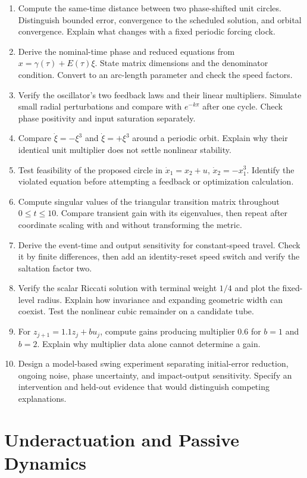 \documentclass[12pt, openany]{book}
\theoremstyle{plain}
\begin{document}
\begin{enumerate}[itemsep=3pt,parsep=0pt]
\item Compute the same-time distance between two phase-shifted unit circles.
Distinguish bounded error, convergence to the scheduled solution, and orbital
convergence. Explain what changes with a fixed periodic forcing clock.
\item Derive the nominal-time phase and reduced equations from
$x=\gamma(\tau)+E(\tau)\xi$. State matrix dimensions and the denominator
condition. Convert to an arc-length parameter and check the speed factors.
\item Verify the oscillator's two feedback laws and their linear multipliers.
Simulate small radial perturbations and compare with $e^{-k\pi}$ after one
cycle. Check phase positivity and input saturation separately.
\item Compare $\dot\xi=-\xi^3$ and $\dot\xi=+\xi^3$ around a periodic orbit.
Explain why their identical unit multiplier does not settle nonlinear stability.
\item Test feasibility of the proposed circle in
$\dot x_1=x_2+u$, $\dot x_2=-x_1^3$. Identify the violated equation before
attempting a feedback or optimization calculation.
\item Compute singular values of the triangular transition matrix throughout
$0\leq t\leq10$. Compare transient gain with its eigenvalues, then repeat
after coordinate scaling with and without transforming the metric.
\item Derive the event-time and output sensitivity for constant-speed travel.
Check it by finite differences, then add an identity-reset speed switch and
verify the saltation factor two.
\item Verify the scalar Riccati solution with terminal weight $1/4$ and plot
the fixed-level radius. Explain how invariance and expanding geometric width
can coexist. Test the nonlinear cubic remainder on a candidate tube.
\item For $z_{j+1}=1.1z_j+b u_j$, compute gains producing multiplier $0.6$
for $b=1$ and $b=2$. Explain why multiplier data alone cannot determine a gain.
\item Design a model-based swing experiment separating initial-error reduction,
ongoing noise, phase uncertainty, and impact-output sensitivity. Specify an
intervention and held-out evidence that would distinguish competing explanations.
\end{enumerate}

\chapter{Underactuation and Passive Dynamics}
\label{ch:underactuation}
\end{document}

